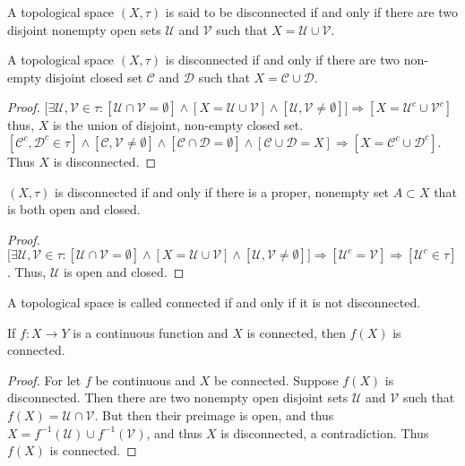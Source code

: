         \begin{definition}
        A topological space $(X,\tau)$ is said to be disconnected if and only if there are two disjoint nonempty open sets $\mathcal{U}$ and $\mathcal{V}$ such that $X = \mathcal{U}\cup \mathcal{V}$.
        \end{definition}
        \begin{theorem}
        A topological space $(X,\tau)$ is disconnected if and only if there are two non-empty disjoint closed set $\mathcal{C}$ and $\mathcal{D}$ such that $X=\mathcal{C}\cup\mathcal{D}$.
        \end{theorem}
        \begin{proof}
        $\big[\exists \mathcal{U},\mathcal{V}\in \tau: [\mathcal{U}\cap \mathcal{V}=\emptyset]\land [X=\mathcal{U}\cup \mathcal{V}]\land [\mathcal{U},\mathcal{V}\ne \emptyset]\big]\Rightarrow [X = \mathcal{U}^c\cup \mathcal{V}^c]$ thus, $X$ is the union of disjoint, non-empty closed set. $[\mathcal{C}^c,\mathcal{D}^c\in \tau]\land[\mathcal{C},\mathcal{V}\ne\emptyset]\land[\mathcal{C}\cap \mathcal{D}=\emptyset]\land[\mathcal{C}\cup\mathcal{D}=X]\Rightarrow [X=\mathcal{C}^c\cup\mathcal{D}^c].$ Thus $X$ is disconnected.
        \end{proof}
        \begin{theorem}
        $(X,\tau)$ is disconnected if and only if there is a proper, nonempty set $A\subset X$ that is both open and closed.
        \end{theorem}
        \begin{proof}
        $\big[\exists \mathcal{U},\mathcal{V}\in \tau:[\mathcal{U}\cap \mathcal{V}=\emptyset]\land [X=\mathcal{U}\cup\mathcal{V}]\land[\mathcal{U},\mathcal{V}\ne \emptyset]\big]\Rightarrow [\mathcal{U}^c = \mathcal{V}]\Rightarrow [\mathcal{U}^c\in \tau]$. Thus, $\mathcal{U}$ is open and closed.
        \end{proof}
        \begin{definition}
        A topological space is called connected if and only if it is not disconnected.
        \end{definition}
        \begin{theorem}
        If $f:X\rightarrow Y$ is a continuous function and $X$ is connected, then $f(X)$ is connected.
        \end{theorem}
        \begin{proof}
        For let $f$ be continuous and $X$ be connected. Suppose $f(X)$ is disconnected. Then there are two nonempty open disjoint sets $\mathcal{U}$ and $\mathcal{V}$ such that $f(X) = \mathcal{U}\cap \mathcal{V}$. But then their preimage is open, and thus $X=f^{-1}(\mathcal{U})\cup f^{-1}(\mathcal{V})$, and thus $X$ is disconnected, a contradiction. Thus $f(X)$ is connected.
        \end{proof}
